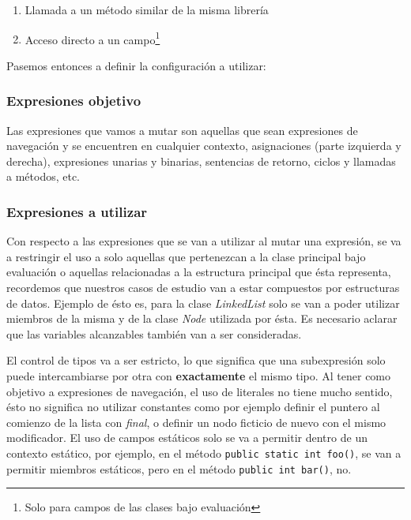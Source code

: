 \begin{enumerate}[label=\arabic*), leftmargin=.75cm,align=left]
	\item Llamada a un m\'etodo similar de la misma librer\'ia
	\item Acceso directo a un campo\footnote{Solo para campos de las clases bajo evaluaci\'on}
\end{enumerate}

Pasemos entonces a definir la configuraci\'on a utilizar:

\subsubsection{Expresiones objetivo}

Las expresiones que vamos a mutar son aquellas que sean expresiones de navegaci\'on y se encuentren en cualquier contexto, asignaciones (parte izquierda y derecha), expresiones unarias y binarias, sentencias de retorno, ciclos y llamadas a m\'etodos, etc.

\subsubsection{Expresiones a utilizar}

Con respecto a las expresiones que se van a utilizar al mutar una expresi\'on, se va a restringir el uso a solo aquellas que pertenezcan a la clase principal bajo evaluaci\'on o aquellas relacionadas a la estructura principal que \'esta representa, recordemos que nuestros casos de estudio van a estar compuestos por estructuras de datos. Ejemplo de \'esto es, para la clase \emph{LinkedList} solo se van a poder utilizar miembros de la misma y de la clase \emph{Node} utilizada por \'esta. Es necesario aclarar que las variables alcanzables tambi\'en van a ser consideradas.

El control de tipos va a ser estricto, lo que significa que una subexpresi\'on solo puede intercambiarse por otra con \textbf{exactamente} el mismo tipo. Al tener como objetivo a expresiones de navegaci\'on, el uso de literales no tiene mucho sentido, \'esto no significa no utilizar constantes como por ejemplo definir el puntero al comienzo de la lista con \emph{final}, o definir un nodo ficticio de nuevo con el mismo modificador. El uso de campos est\'aticos solo se va a permitir dentro de un contexto est\'atico, por ejemplo, en el m\'etodo \lstinline|public static int foo()|, se van a permitir miembros est\'aticos, pero en el m\'etodo \lstinline|public int bar()|, no.

